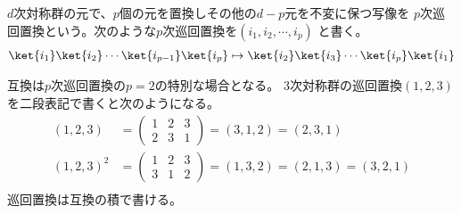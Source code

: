 	\begin{definition}[巡回置換]\label{def:巡回置換} %
		$d$次対称群の元で、$p$個の元を置換しその他の$d-p$元を不変に保つ写像を
		$p$次巡回置換という。次のような$p$次巡回置換を$(i_1,i_2,\cdots,i_p)$
		と書く。
		\begin{equation*}\begin{split} %
			\ket{i_1}\ket{i_2}\cdots\ket{i_{p-1}}\ket{i_p}
			\mapsto \ket{i_2}\ket{i_3}\cdots\ket{i_p}\ket{i_1}
		\end{split}\end{equation*} %
	\end{definition} %

	互換は$p$次巡回置換の$p=2$の特別な場合となる。
	$3$次対称群の巡回置換$(1,2,3)$を二段表記で書くと次のようになる。
	\begin{equation*}\begin{split} %
		(1,2,3) &= \begin{pmatrix} 1 & 2 & 3 \\ 2 & 3 & 1\end{pmatrix}
			= (3,1,2) = (2,3,1) \\
		(1,2,3)^2 &= \begin{pmatrix} 1 & 2 & 3 \\ 3 & 1 & 2\end{pmatrix}
			= (1,3,2) = (2,1,3) = (3,2,1) \\
	\end{split}\end{equation*} %
	巡回置換は互換の積で書ける。

